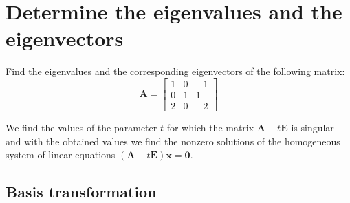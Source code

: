 \section{Determine the eigenvalues and the eigenvectors}

\begin{frame}
\begin{example} Find the eigenvalues and the corresponding eigenvectors of the following matrix:
\begin{equation*}
\mathbf{A}=\left[\begin{array}{rrr}
1 & 0 & -1 \\
0 & 1 & 1 \\
2 & 0 & -2
\end{array}\right]
\end{equation*}
\end{example}
We find the values of the parameter $t$ for which the matrix $\mathbf{A}-t\mathbf{E}$ is singular and with the obtained values we find the nonzero solutions of the homogeneous system of linear equations $(\mathbf{A}-t\mathbf{E})\mathbf{x}=\mathbf{0}.$
\end{frame}

\subsection{Basis transformation}

